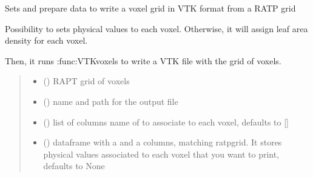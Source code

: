 \documentclass[letterpaper,10pt,english]{sphinxmanual}
\begin{document}

\begin{fulllineitems}
\label{\detokenize{reference:VTK.ratp_prepareVTK}}
\pysigstartsignatures
{}
\pysigstopsignatures
\sphinxAtStartPar
Sets and prepare data to write a voxel grid in VTK format from a RATP grid

\sphinxAtStartPar
Possibility to sets physical values to each voxel. Otherwise, it will assign leaf area density
for each voxel.

\sphinxAtStartPar
Then, it runs :func:VTKvoxels to write a VTK file with the grid of voxels.
\begin{quote}\begin{description}
\begin{itemize}
\item {} 
\sphinxAtStartPar
{} () \textendash{} RAPT grid of voxels

\item {} 
\sphinxAtStartPar
{} () \textendash{} name and path for the output file

\item {} 
\sphinxAtStartPar
{} (\sphinxstyleliteralemphasis{\sphinxupquote{, }}) \textendash{} list of columns name of  to associate to each voxel, defaults to {[}{]}

\item {} 
\sphinxAtStartPar
{} (\sphinxstyleliteralemphasis{\sphinxupquote{, }}) \textendash{} dataframe with a  and a  columns, matching ratpgrid. It stores physical values associated to each voxel that you want to print, defaults to None

\end{itemize}

\end{description}\end{quote}

\end{fulllineitems}
\end{document}

